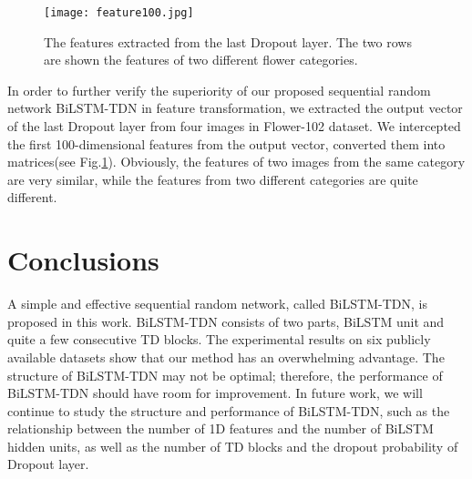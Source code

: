 \documentclass[10pt,twocolumn,letterpaper]{article}
\begin{document}
\begin{figure}[!htbp]
	\centering
	\texttt{[image: feature100.jpg]}
	\caption{The features extracted from the last Dropout layer. The two rows are shown the features of two different flower categories.}
	\label{outputDP}
\end{figure}

In order to further verify the superiority of our proposed sequential random network BiLSTM-TDN in feature transformation, we extracted the output vector of the last Dropout layer from four images in Flower-102 dataset. We intercepted the first 100-dimensional features from the output vector, converted them into matrices(see Fig.\ref{outputDP}). Obviously, the features of two images from the same category are very similar, while the features from two different categories are quite different.
\section{Conclusions}
A simple and effective sequential random network, called BiLSTM-TDN, is proposed in this work. BiLSTM-TDN consists of two parts, BiLSTM unit and quite a few consecutive TD blocks. The experimental results on six publicly available datasets show that our method has an overwhelming advantage. The structure of BiLSTM-TDN may not be optimal; therefore, the performance of BiLSTM-TDN should have room for improvement. In future work, we will continue to study the structure and performance of BiLSTM-TDN, such as the relationship between the number of 1D features and the number of BiLSTM hidden units, as well as the number of TD blocks and the dropout probability of Dropout layer. 
{\small
	
	
}			
\end{document}
